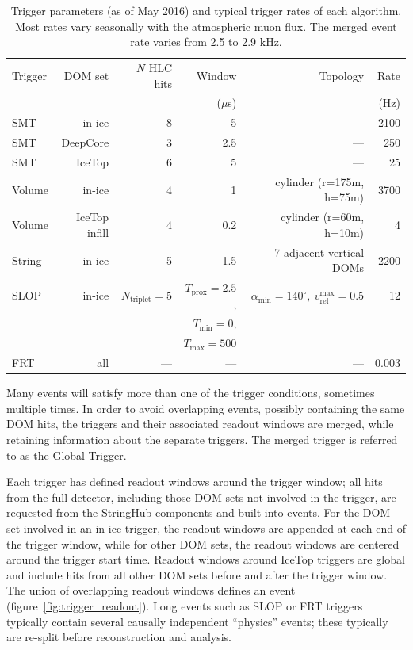 \begin{table}
  \centering \footnotesize
\caption{Trigger parameters (as of May 2016) and typical trigger
  rates of each algorithm.  Most rates vary seasonally with the atmospheric
  muon flux.  The merged event rate varies from 2.5 to
  2.9 kHz.}  
\begin{tabular}{lrrrrr}
  \hline Trigger & DOM set & $N$ HLC hits & Window & Topology & Rate\\
  & & & ($\mu$s) & & (Hz) \\
  \hline
  SMT & in-ice & 8 & 5 & --- & 2100\\
  SMT & DeepCore & 3 & 2.5 & --- & 250\\
  SMT & IceTop & 6 & 5 & --- & 25\\
  Volume & in-ice & 4 & 1 & cylinder (r=175m, h=75m) & 3700\\
  Volume & IceTop infill & 4 & 0.2 & cylinder (r=60m, h=10m) & 4\\
  String & in-ice & 5 & 1.5 & 7 adjacent vertical DOMs & 2200\\
  SLOP & in-ice & $N_{\mathrm{triplet}} = 5$ & $T_{\mathrm{prox}} = 2.5$, &
  $\alpha_{\mathrm{min}} = 140^\circ,\ v_{\mathrm{rel}}^{\mathrm{max}}
  = 0.5$ & 12\\
  & & & $T_{\mathrm{min}} = 0$, & &\\
  & & & $T_{\mathrm{max}} = 500$ & &\\
  FRT & all & --- & --- & --- & 0.003\\
  \hline
\end{tabular}
\label{tab:triggers}
\end{table}

Many events will satisfy more than one of the trigger conditions, sometimes
multiple times.  In order to avoid overlapping events, possibly containing
the same DOM hits, the triggers and their associated readout windows are
merged, while retaining information about the separate triggers.  The
merged trigger is referred to as the Global Trigger.

Each trigger has defined readout windows around the trigger window; all
hits from the full detector, including those DOM sets not involved in the trigger,
are requested from the StringHub components and built into events.  For the
DOM set involved in an in-ice trigger, the readout windows are appended at each end of the trigger
window, while for other DOM sets, the readout windows are centered around
the trigger start time.  Readout windows around IceTop triggers are global
and include hits from all other DOM sets before and after the trigger
window. The union of overlapping readout windows defines 
an event (figure~\ref{fig:trigger_readout}).  Long events such as SLOP or FRT
triggers typically contain several causally independent ``physics'' events;
these typically are re-split before reconstruction and analysis.

